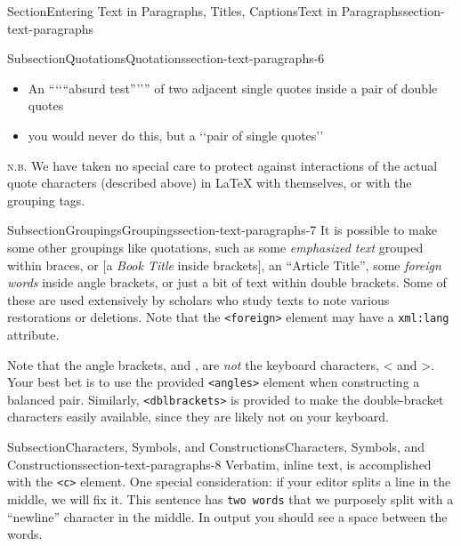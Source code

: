 \documentclass[twoside,10pt,]{article}
\newcommand{\mono}[1]{\texttt{#1}}
\newcommand{\abbreviation}[1]{%
\textsc{\MakeLowercase{#1}}}
\newcommand{\pubtitle}[1]{\textsl{#1}}
\numberwithin{equation}{section}
\begin{document}
\begin{sectionptx}{Section}{Entering Text in Paragraphs, Titles, Captions}{}{Text in Paragraphs}{}{}{section-text-paragraphs}
\begin{subsectionptx}{Subsection}{Quotations}{}{Quotations}{}{}{section-text-paragraphs-6}
\begin{itemize}[label=\textbullet]
\item{}An ``{`}{`}``absurd test''{'}{'}'' of two adjacent single quotes inside a pair of double quotes%
\item{}you would never do this, but a {`}{`}pair of single quotes{'}{'}%
\end{itemize}
%
\par
\abbreviation{N.B.} We have taken no special care to protect against interactions of the actual quote characters (described above) in \LaTeX{} with themselves, or with the grouping tags.%
\end{subsectionptx}
%
%
\typeout{************************************************}
\typeout{************************************************}
%
\begin{subsectionptx}{Subsection}{Groupings}{}{Groupings}{}{}{section-text-paragraphs-7}
It is possible to make some other groupings like quotations, such as \textbraceleft{}some \emph{emphasized text} grouped within braces\textbraceright{}, or [a \pubtitle{Book Title} inside brackets], an ``Article Title'', \textlangle{}some \textit{foreign words} inside angle brackets\textrangle{}, or \textlbrackdbl{}just a bit of text within double brackets\textrbrackdbl{}.  Some of these are used extensively by scholars who study texts to note various restorations or deletions.  Note that the \mono{<foreign>} element may have a \mono{xml:lang} attribute.%
\par
Note that the angle brackets, \textlangle{} and \textrangle{}, are \emph{not} the keyboard characters, \textless{} and \textgreater{}.  Your best bet is to use the provided \mono{<angles>} element when constructing a balanced pair.  Similarly, \mono{<dblbrackets>} is provided to make the double-bracket characters easily available, since they are likely not on your keyboard.%
\end{subsectionptx}
%
%
\typeout{************************************************}
\typeout{************************************************}
%
\begin{subsectionptx}{Subsection}{Characters, Symbols, and Constructions}{}{Characters, Symbols, and Constructions}{}{}{section-text-paragraphs-8}
Verbatim, inline text, is accomplished with the \mono{<c>} element.  One special consideration: if your editor splits a line in the middle, we will fix it.  This sentence has \mono{two words} that we purposely split with a ``newline'' character in the middle.  In output you should see a space between the words.%

\end{subsectionptx}
\end{sectionptx}
\end{document}
